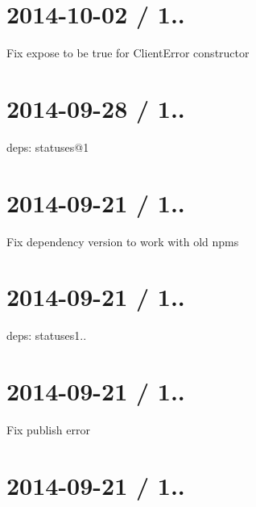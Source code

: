 \section*{2014-\/10-\/02 / 1.. }


\begin{DoxyItemize}
\item Fix {\ttfamily expose} to be {\ttfamily true} for {\ttfamily Client\+Error} constructor
\end{DoxyItemize}

\section*{2014-\/09-\/28 / 1.. }


\begin{DoxyItemize}
\item deps\+: statuses@1
\end{DoxyItemize}

\section*{2014-\/09-\/21 / 1.. }


\begin{DoxyItemize}
\item Fix dependency version to work with old {\ttfamily npm}s
\end{DoxyItemize}

\section*{2014-\/09-\/21 / 1.. }


\begin{DoxyItemize}
\item deps\+: statuses1..
\end{DoxyItemize}

\section*{2014-\/09-\/21 / 1.. }


\begin{DoxyItemize}
\item Fix publish error
\end{DoxyItemize}

\section*{2014-\/09-\/21 / 1.. }


